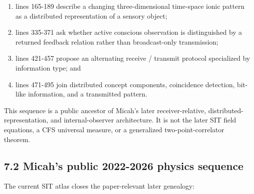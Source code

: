 \documentclass[
  american,
  11pt,
  letterpaper,
]{article}
\providecommand{\tightlist}{%
  \setlength{\itemsep}{0pt}\setlength{\parskip}{0pt}}
\begin{document}
\begin{enumerate}
\def\labelenumi{\arabic{enumi}.}
\tightlist
\item
  lines 165-189 describe a changing three-dimensional time-space ionic pattern as a distributed representation of a sensory object;
\item
  lines 335-371 ask whether active conscious observation is distinguished by a returned feedback relation rather than broadcast-only transmission;
\item
  lines 421-457 propose an alternating receive / transmit protocol specialized by information type; and
\item
  lines 471-495 join distributed concept components, coincidence detection, bit-like information, and a transmitted pattern.
\end{enumerate}

This sequence is a public ancestor of Micah's later receiver-relative, distributed-representation, and internal-observer architecture. It is not the later SIT field equations, a CFS universal measure, or a generalized two-point-correlator theorem.

\subsection{7.2 Micah's public 2022-2026 physics sequence}\label{micahs-public-2022-2026-physics-sequence}

The current SIT atlas closes the paper-relevant later genealogy:
\end{document}
